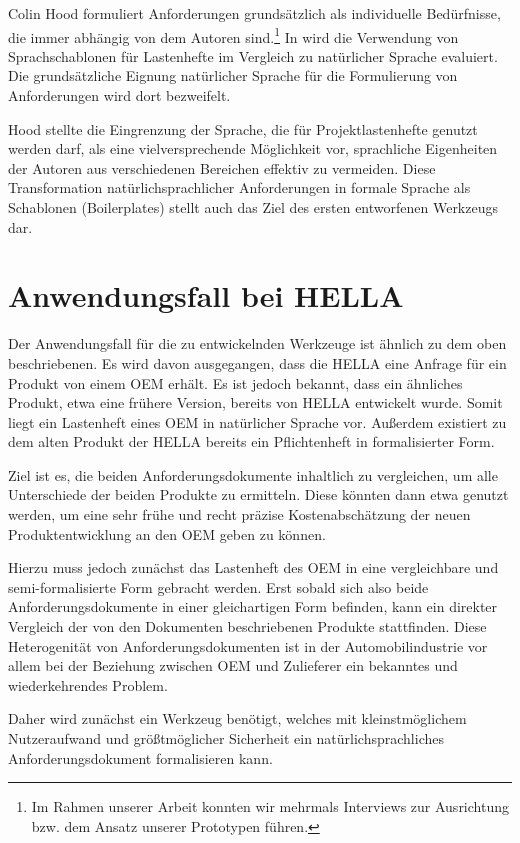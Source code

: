 \documentclass[12pt]{report}
\begin{document}
Colin Hood formuliert Anforderungen grundsätzlich als \glqq individuelle Bedürfnisse\grqq{}, die immer abhängig von dem Autoren sind.\footnote{Im Rahmen unserer Arbeit konnten wir mehrmals Interviews zur Ausrichtung bzw. dem Ansatz unserer Prototypen führen.} In \cite{kr93} wird die Verwendung von Sprachschablonen für Lastenhefte im Vergleich zu natürlicher Sprache evaluiert. Die grundsätzliche Eignung natürlicher Sprache für die Formulierung von Anforderungen wird dort bezweifelt. 

Hood stellte die Eingrenzung der Sprache, die für Projektlastenhefte genutzt werden darf, als eine vielversprechende Möglichkeit vor, sprachliche Eigenheiten der Autoren aus verschiedenen Bereichen effektiv zu vermeiden. Diese Transformation natürlichsprachlicher Anforderungen in formale Sprache als Schablonen (Boilerplates) stellt auch das Ziel des ersten entworfenen Werkzeugs dar.

\section{Anwendungsfall bei HELLA} 
Der Anwendungsfall für die zu entwickelnden Werkzeuge ist ähnlich zu dem oben beschriebenen. Es wird davon ausgegangen, dass die HELLA eine Anfrage für ein Produkt von einem OEM erhält. Es ist jedoch bekannt, dass ein ähnliches Produkt, etwa eine frühere Version, bereits von HELLA entwickelt wurde. Somit liegt ein Lastenheft eines OEM in natürlicher Sprache vor. Außerdem existiert zu dem alten Produkt der HELLA bereits ein Pflichtenheft in formalisierter Form. 

Ziel ist es, die beiden Anforderungsdokumente inhaltlich zu vergleichen, um alle Unterschiede der beiden Produkte zu ermitteln. Diese könnten dann etwa genutzt werden, um eine sehr frühe und recht präzise Kostenabschätzung der neuen Produktentwicklung an den OEM geben zu können. 

Hierzu muss jedoch zunächst das Lastenheft des OEM in eine vergleichbare und semi-formalisierte Form gebracht werden. Erst sobald sich also beide Anforderungsdokumente in einer gleichartigen Form befinden, kann ein direkter Vergleich der von den Dokumenten beschriebenen Produkte stattfinden. Diese Heterogenität von Anforderungsdokumenten ist in der Automobilindustrie vor allem bei der Beziehung zwischen OEM und Zulieferer ein bekanntes und wiederkehrendes Problem.

Daher wird zunächst ein Werkzeug benötigt, welches mit kleinstmöglichem Nutzeraufwand und größtmöglicher Sicherheit ein natürlichsprachliches Anforderungsdokument formalisieren kann. 
\end{document}
